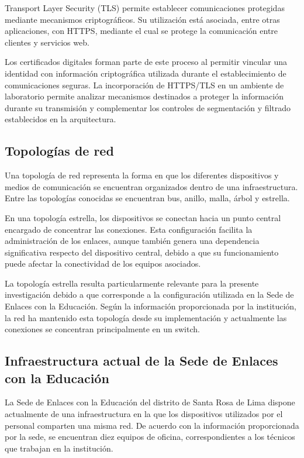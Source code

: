 Transport Layer Security (TLS) permite establecer comunicaciones protegidas mediante mecanismos criptográficos. Su utilización está asociada, entre otras aplicaciones, con HTTPS, mediante el cual se protege la comunicación entre clientes y servicios web.

Los certificados digitales forman parte de este proceso al permitir vincular una identidad con información criptográfica utilizada durante el establecimiento de comunicaciones seguras. La incorporación de HTTPS/TLS en un ambiente de laboratorio permite analizar mecanismos destinados a proteger la información durante su transmisión y complementar los controles de segmentación y filtrado establecidos en la arquitectura.

\subsection{Topologías de red}

Una topología de red representa la forma en que los diferentes dispositivos y medios de comunicación se encuentran organizados dentro de una infraestructura. Entre las topologías conocidas se encuentran bus, anillo, malla, árbol y estrella.

En una topología estrella, los dispositivos se conectan hacia un punto central encargado de concentrar las conexiones. Esta configuración facilita la administración de los enlaces, aunque también genera una dependencia significativa respecto del dispositivo central, debido a que su funcionamiento puede afectar la conectividad de los equipos asociados.

La topología estrella resulta particularmente relevante para la presente investigación debido a que corresponde a la configuración utilizada en la Sede de Enlaces con la Educación. Según la información proporcionada por la institución, la red ha mantenido esta topología desde su implementación y actualmente las conexiones se concentran principalmente en un switch.

\subsection{Infraestructura actual de la Sede de Enlaces con la Educación}

La Sede de Enlaces con la Educación del distrito de Santa Rosa de Lima dispone actualmente de una infraestructura en la que los dispositivos utilizados por el personal comparten una misma red. De acuerdo con la información proporcionada por la sede, se encuentran diez equipos de oficina, correspondientes a los técnicos que trabajan en la institución.

